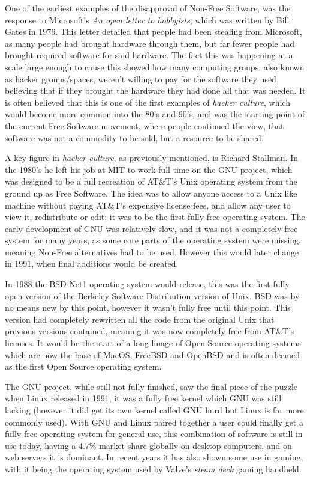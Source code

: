 \documentclass[a4paper,12pt]{article}
\begin{document}
{One of the earliest examples of the disapproval of Non-Free Software, was the response to Microsoft's \textit{An
open letter to hobbyists}\cite{OPENletter}, which was written by Bill Gates in 1976. This letter detailed that
people had been stealing from Microsoft, as many people had brought hardware through them, but far fewer people
had brought required software for said hardware. The fact this was happening at a scale large enough to cause this
showed how many computing groups, also known as hacker groups/spaces, weren't willing to pay for the software they
used, believing that if they brought the hardware they had done all that was needed\cite{OPENletter}. It is often
believed that this is one of the first examples of \textit{hacker culture}, which would become more common into the
80's and 90's, and was the starting point of the current Free Software movement, where people continued the view,
that software was not a commodity to be sold, but a resource to be shared.

A key figure in \textit{hacker culture}, as previously mentioned, is Richard Stallman. In the
 1980's he left his job at MIT to work full time on the GNU project, which was designed
to be a full recreation of AT\&T's Unix operating system from the ground up as Free Software.  The idea was to
allow anyone access to a Unix like machine without paying AT\&T's expensive license fees, and allow any user to
view it, redistribute or edit; it was to be the first fully free operating system. The early development of GNU
was relatively slow, and it was not a completely free system for many years, as some core parts of the operating
system were missing, meaning Non-Free alternatives had to be used. However this would later change in 1991, when
final additions would be created.

In 1988 the BSD Net1 operating system would release\cite{BSDnet1}, this was the first fully open version of the
Berkeley Software Distribution version of Unix. BSD was by no means new by this point, however it wasn't fully
free until this point. This version had completely rewritten all the code from the original Unix that previous
versions contained, meaning it was now completely free from AT\&T's licenses.  It would be the start of a long
linage of Open Source operating systems which are now the base of MacOS, FreeBSD and OpenBSD and is often deemed
as the first Open Source operating system.

The GNU project, while still not fully finished, saw the final piece of the puzzle when Linux\cite{LINUX} released in
1991, it was a fully free kernel which GNU was still lacking (however it did get its own kernel called GNU hurd but
Linux is far more commonly used). With GNU and Linux paired together a user could finally get a fully free operating
system for general use, this combination of software is still in use today, having a 4.7\% market share globally
on desktop computers\cite{LINUXmarket}, and on web servers it is dominant. In recent years it has also shown some
use in gaming, with it being the operating system used by Valve's \textit{steam deck} gaming handheld\cite{STEAMdeck}.

}
\end{document}
